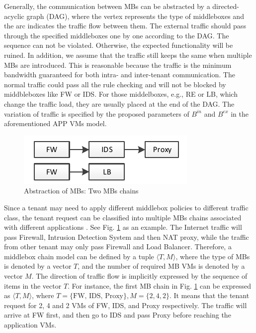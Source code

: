 \documentclass[review]{elsarticle}
\begin{document}
Generally, the communication between MBs can be abstracted by a directed-acyclic graph (DAG), where the vertex represents the type of middleboxes and the arc indicates the traffic flow between them. The external traffic should pass through the specified middleboxes one by one according to the DAG. The sequence can not be violated. Otherwise, the expected functionality will be ruined. In addition, we assume that the traffic still keeps the same when multiple MBs are introduced. This is reasonable because the traffic is the minimum bandwidth guaranteed for both intra- and inter-tenant communication. The normal traffic could pass all the rule checking and will not be blocked by middbleboxes like FW or IDS. For those middelboxes, e.g., RE or LB, which change the traffic load, they are usually placed at the end of the DAG. The variation of traffic is specified by the proposed parameters of $B^{in}$ and $B^{ex}$ in the aforementioned APP VMs model.

\begin{figure}
	\centering
		\includegraphics[width=3.0 in]{fig/chain.pdf}
	\caption{Abstraction of MBs: Two MBs chains}
	\label{fig:chain}
\end{figure}


Since a tenant may need to apply different middlebox policies to different traffic class, the tenant request can be classified into multiple MBs chains associated with different applications \cite{stratos12, M14sap, 7243304}. See Fig. \ref{fig:chain} as an example. The Internet traffic will pass Firewall, Intrusion Detection System and then NAT proxy, while the traffic from other tenant may only pass Firewall and Load Balancer. Therefore, a middlebox chain model can be defined by a tuple $\langle T, M \rangle$, where the type of MBs is denoted by a vector $T$, and the number of required MB VMs is denoted by a vector $M$. The direction of traffic flow is implicitly expressed by the sequence of items in the vector $T$. For instance, the first MB chain in Fig. \ref{fig:chain} can be expressed as $\langle T, M \rangle$, where $T=\{\text{FW, IDS, Proxy}\}, M=\{2, 4, 2\}$. It means that the tenant request for 2, 4 and 2 VMs of FW, IDS, and Proxy respectively. The traffic will arrive at FW first, and then go to IDS and pass Proxy before reaching the application VMs.
\end{document}
